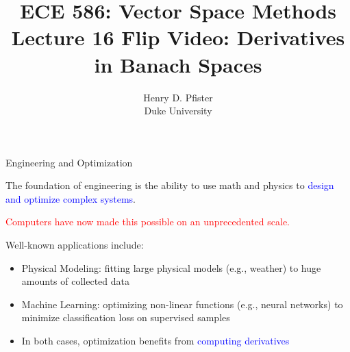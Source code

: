 \documentclass[10pt,english,aspectratio=169]{beamer}
\begin{document}
\title{ECE 586: Vector Space Methods \\ Lecture 16 Flip Video: Derivatives in Banach Spaces}
\author{Henry D. Pfister \\ Duke University}
\date{}


\begin{frame}[plain]
	\titlepage
	
\end{frame}

\addtocounter{framenumber}{-1}



\begin{frame}{Engineering and Optimization}

The foundation of engineering is the ability to use math and physics to \textcolor{blue}{design and optimize complex systems}.

\vspace{4mm}

\textcolor{red}{Computers have now made this possible on an unprecedented scale.}

\vspace{4mm}

Well-known applications include: \vspace{1mm}
\begin{itemize}
\setlength\itemsep{3mm}
\item<1-> Physical Modeling: fitting large physical models (e.g., weather) to huge amounts of collected data

\item<2-> Machine Learning: optimizing non-linear functions (e.g., neural networks) to minimize classification loss on supervised samples

\item<3-> In both cases, optimization benefits from \textcolor{blue}{computing derivatives}

\end{itemize}
\end{frame}
\end{document}
